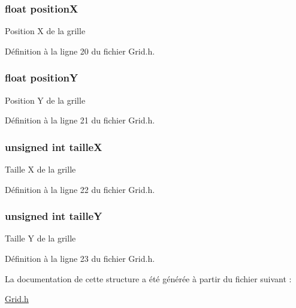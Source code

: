 \hypertarget{struct_grid_a79a982036e5591bf27af7cc2edcd6f4c}{
\subsubsection[{position\-X}]{\setlength{\rightskip}{0pt plus 5cm}float position\-X}}\label{struct_grid_a79a982036e5591bf27af7cc2edcd6f4c}
Position X de la grille 

Définition à la ligne 20 du fichier Grid.\-h.

\hypertarget{struct_grid_ad17be35b83017d6dc83074e6b8d21207}{
\subsubsection[{position\-Y}]{\setlength{\rightskip}{0pt plus 5cm}float position\-Y}}\label{struct_grid_ad17be35b83017d6dc83074e6b8d21207}
Position Y de la grille 

Définition à la ligne 21 du fichier Grid.\-h.

\hypertarget{struct_grid_a14a7f2008ff990cae95babeb28176bad}{
\subsubsection[{taille\-X}]{\setlength{\rightskip}{0pt plus 5cm}unsigned int taille\-X}}\label{struct_grid_a14a7f2008ff990cae95babeb28176bad}
Taille X de la grille 

Définition à la ligne 22 du fichier Grid.\-h.

\hypertarget{struct_grid_ab277c464cec35f230262c48fec89a566}{
\subsubsection[{taille\-Y}]{\setlength{\rightskip}{0pt plus 5cm}unsigned int taille\-Y}}\label{struct_grid_ab277c464cec35f230262c48fec89a566}
Taille Y de la grille 

Définition à la ligne 23 du fichier Grid.\-h.



La documentation de cette structure a été générée à partir du fichier suivant \-:\begin{DoxyCompactItemize}
\item 
\hyperlink{_grid_8h}{Grid.\-h}\end{DoxyCompactItemize}
